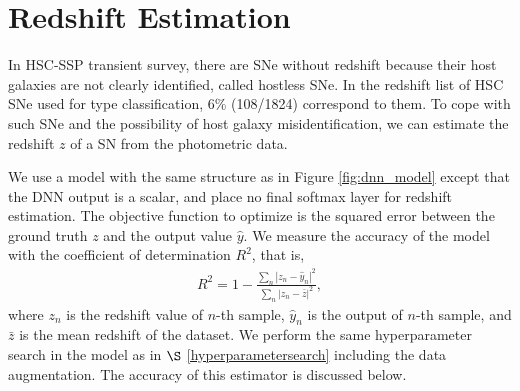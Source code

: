 \documentclass[useamsfonts]{pasj01}
\begin{document}
\section*{Redshift Estimation}
\label{sec:est_redshift}
In HSC-SSP transient survey, there are SNe without redshift because their host galaxies are not clearly identified, called hostless SNe.
In the redshift list of HSC SNe used for type classification, 6\% (108/1824) correspond to them.
To cope with such SNe and the possibility of host galaxy misidentification,
we can estimate the redshift $z$ of a SN from the photometric data.

We use a model with the same structure as in Figure \ref{fig:dnn_model} except that the DNN output is a scalar, and place no final softmax layer for redshift estimation.
The objective function to optimize is the squared error between the ground truth $z$ and the output value $\hat{y}$.
We measure the accuracy of the model with the coefficient of determination $R^2$, that is,
\begin{eqnarray*}
    R^2 = 1 - \frac{\sum_n \left| z_n - \hat{y}_n \right|^2}{\sum_n \left| z_n - \bar{z} \right|^2}, 
\end{eqnarray*}
where $z_n$ is the redshift value of $n$-th sample, $\hat{y}_n$ is the output of $n$-th sample, 
and $\bar{z}$ is the mean redshift of the dataset.
We perform the same hyperparameter search in the model as in $\S$ \ref{hyperparametersearch} 
including the data augmentation.
The accuracy of this estimator is discussed below.
\end{document}
